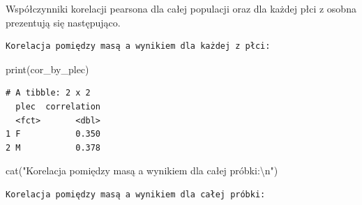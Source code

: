 \documentclass[
  letterpaper,
  DIV=11,
  numbers=noendperiod]{scrartcl}
\newenvironment{Shaded}{\begin{snugshade}}{\end{snugshade}}
\newcommand{\AttributeTok}[1]{\textcolor[rgb]{0.40,0.45,0.13}{#1}}
\newcommand{\CommentTok}[1]{\textcolor[rgb]{0.37,0.37,0.37}{#1}}
\newcommand{\FunctionTok}[1]{\textcolor[rgb]{0.28,0.35,0.67}{#1}}
\newcommand{\NormalTok}[1]{\textcolor[rgb]{0.00,0.23,0.31}{#1}}
\newcommand{\OtherTok}[1]{\textcolor[rgb]{0.00,0.23,0.31}{#1}}
\newcommand{\SpecialCharTok}[1]{\textcolor[rgb]{0.37,0.37,0.37}{#1}}
\newcommand{\StringTok}[1]{\textcolor[rgb]{0.13,0.47,0.30}{#1}}
\begin{document}
Współczynniki korelacji pearsona dla całej populacji oraz dla każdej
płci z osobna prezentują się następująco.

\begin{Shaded}
\end{Shaded}

\begin{verbatim}
Korelacja pomiędzy masą a wynikiem dla każdej z płci:
\end{verbatim}

\begin{Shaded}
\begin{Highlighting}[]
\FunctionTok{print}\NormalTok{(cor\_by\_plec)}
\end{Highlighting}
\end{Shaded}

\begin{verbatim}
# A tibble: 2 x 2
  plec  correlation
  <fct>       <dbl>
1 F           0.350
2 M           0.378
\end{verbatim}

\begin{Shaded}
\begin{Highlighting}[]
\FunctionTok{cat}\NormalTok{(}\StringTok{"Korelacja pomiędzy masą a wynikiem dla całej próbki:}\SpecialCharTok{\textbackslash{}n}\StringTok{"}\NormalTok{)}
\end{Highlighting}
\end{Shaded}

\begin{verbatim}
Korelacja pomiędzy masą a wynikiem dla całej próbki:
\end{verbatim}
\end{document}
